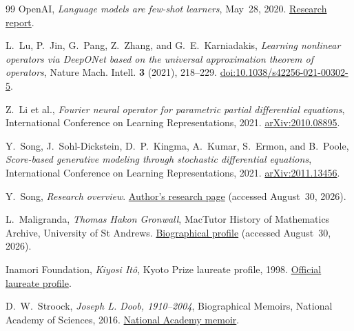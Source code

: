 \documentclass[11pt]{amsart}
\numberwithin{equation}{section}
\theoremstyle{plain}
\begin{document}
\begin{thebibliography}{99}
OpenAI,
\emph{Language models are few-shot learners}, May~28, 2020.
\href{https://openai.com/index/language-models-are-few-shot-learners/}
{Research report}.

L.~Lu, P.~Jin, G.~Pang, Z.~Zhang, and G.~E.~Karniadakis,
\emph{Learning nonlinear operators via DeepONet based on the universal
approximation theorem of operators},
Nature Mach. Intell. \textbf{3} (2021), 218--229.
\href{https://doi.org/10.1038/s42256-021-00302-5}
{doi:10.1038/s42256-021-00302-5}.

Z.~Li et al.,
\emph{Fourier neural operator for parametric partial differential equations},
International Conference on Learning Representations, 2021.
\href{https://arxiv.org/abs/2010.08895}{arXiv:2010.08895}.

Y.~Song, J.~Sohl-Dickstein, D.~P.~Kingma, A.~Kumar, S.~Ermon, and B.~Poole,
\emph{Score-based generative modeling through stochastic differential
equations},
International Conference on Learning Representations, 2021.
\href{https://arxiv.org/abs/2011.13456}{arXiv:2011.13456}.

Y.~Song,
\emph{Research overview}.
\href{https://yang-song.net/}{Author's research page}
(accessed August~30, 2026).

L.~Maligranda,
\emph{Thomas Hakon Gronwall}, MacTutor History of Mathematics Archive,
University of St Andrews.
\href{https://mathshistory.st-andrews.ac.uk/Biographies/Gronwall/}
{Biographical profile} (accessed August~30, 2026).

Inamori Foundation,
\emph{Kiyosi It\^o}, Kyoto Prize laureate profile, 1998.
\href{https://www.kyotoprize.org/en/laureates/kiyosi_ito/}
{Official laureate profile}.

D.~W.~Stroock,
\emph{Joseph L. Doob, 1910--2004},
Biographical Memoirs, National Academy of Sciences, 2016.
\href{https://www.nasonline.org/wp-content/uploads/2024/06/doob-joseph.pdf}
{National Academy memoir}.

\end{thebibliography}
\end{document}
